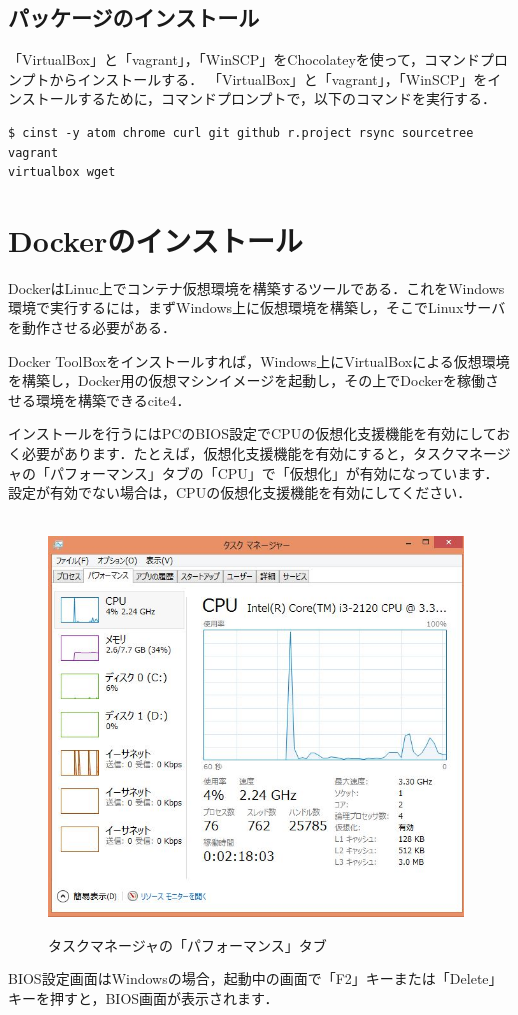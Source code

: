 \newpage

\subsection{パッケージのインストール}
「VirtualBox」と「vagrant」，「WinSCP」をChocolateyを使って，コマンドプロンプトからインストールする．
「VirtualBox」と「vagrant」，「WinSCP」をインストールするために，コマンドプロンプトで，以下のコマンドを実行する．



\begin{lstlisting}[basicstyle=\ttfamily\footnotesize, frame=single]
$ cinst -y atom chrome curl git github r.project rsync sourcetree vagrant 
virtualbox wget
\end{lstlisting}
\newpage


\section{Dockerのインストール}
DockerはLinuc上でコンテナ仮想環境を構築するツールである．これをWindows環境で実行するには，まずWindows上に仮想環境を構築し，そこでLinuxサーバを動作させる必要がある．

Docker ToolBoxをインストールすれば，Windows上にVirtualBoxによる仮想環境を構築し，Docker用の仮想マシンイメージを起動し，その上でDockerを稼働させる環境を構築できるcite{4}．



インストールを行うにはPCのBIOS設定でCPUの仮想化支援機能を有効にしておく必要があります．たとえば，仮想化支援機能を有効にすると，タスクマネージャの「パフォーマンス」タブの「CPU」で「仮想化」が有効になっています．設定が有効でない場合は，CPUの仮想化支援機能を有効にしてください．

\begin{figure}[htb]
\centering　
\includegraphics[width=11cm]{1.JPG}
\caption{タスクマネージャの「パフォーマンス」タブ}\label{tab:uac}
\end{figure}
BIOS設定画面はWindowsの場合，起動中の画面で「F2」キーまたは「Delete」キーを押すと，BIOS画面が表示されます．
\newpage

